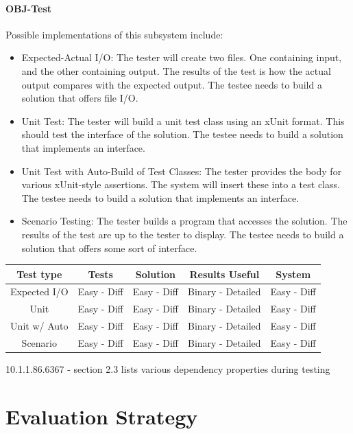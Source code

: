\documentclass[a4paper,11pt]{report}
\begin{document}
\subsubsection*{OBJ-Test}
Possible implementations of this subsystem include:
\begin{itemize}
\item Expected-Actual I/O: The tester will create two files. One containing input, and the other containing output. The results of the test is how the actual output compares with the expected output. The testee needs to build a solution that offers file I/O.
\item Unit Test: The tester will build a unit test class using an xUnit format. This should test the interface of the solution. The testee needs to build a solution that implements an interface.
\item Unit Test with Auto-Build of Test Classes: The tester provides the body for various xUnit-style assertions. The system will insert these into a test class. The testee needs to build a solution that implements an interface.
\item Scenario Testing: The tester builds a program that accesses the solution. The results of the test are up to the tester to display. The testee needs to build a solution that offers some sort of interface.
\end{itemize}
\begin{tabular}{c||c|c|c|c}
Test type & Tests & Solution & Results Useful & System\\\hline
Expected I/O & Easy - Diff & Easy - Diff & Binary - Detailed & Easy - Diff\\
Unit & Easy - Diff & Easy - Diff & Binary - Detailed & Easy - Diff\\
Unit w/ Auto & Easy - Diff & Easy - Diff & Binary - Detailed & Easy - Diff\\
Scenario & Easy - Diff & Easy - Diff & Binary - Detailed & Easy - Diff\\
\end{tabular}
10.1.1.86.6367 - section 2.3 lists various dependency properties during testing 

\chapter{Evaluation Strategy}
\end{document}
